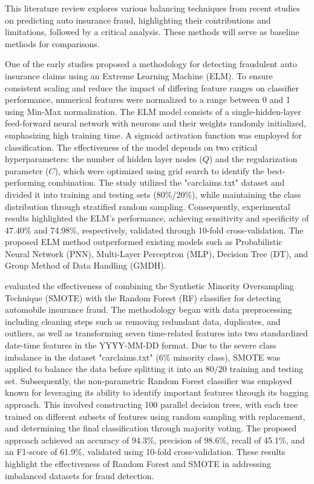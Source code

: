 \documentclass[twoside,11pt]{article}
\begin{document}
This literature review explores various balancing techniques from recent studies on predicting auto insurance fraud, highlighting their contributions and limitations, followed by a critical analysis. These methods will serve as baseline methods for comparisons.

One of the early studies \cite{Patel2019} proposed a methodology for detecting fraudulent auto insurance claims using an Extreme Learning Machine (ELM). To ensure consistent scaling and reduce the impact of differing feature ranges on classifier performance, numerical features were normalized to a range between 0 and 1 using Min-Max normalization. The ELM model consists of a single-hidden-layer feed-forward neural network with neurons and their weights randomly initialized, emphasizing high training time. A sigmoid activation function was employed for classification. The effectiveness of the model depends on two critical hyperparameters: the number of hidden layer nodes (\(Q\)) and the regularization parameter (\(C\)), which were optimized using grid search to identify the best-performing combination. The study utilized the "carclaims.txt" dataset and divided it into training and testing sets (80\%/20\%), while maintaining the class distribution through stratified random sampling. Consequently, experimental results highlighted the ELM's performance, achieving sensitivity and specificity of 47.40\% and 74.98\%, respectively, validated through 10-fold cross-validation. The proposed ELM method outperformed existing models such as Probabilistic Neural Network (PNN), Multi-Layer Perceptron (MLP), Decision Tree (DT), and Group Method of Data Handling (GMDH).


\cite{Harjai2019} evaluated the effectiveness of combining the Synthetic Minority Oversampling Technique (SMOTE) with the Random Forest (RF) classifier for detecting automobile insurance fraud. The methodology began with data preprocessing including cleaning steps such as removing redundant data, duplicates, and outliers, as well as transforming seven time-related features into two standardized date-time features in the YYYY-MM-DD format. Due to the severe class imbalance in the dataset "carclaims.txt" (6\% minority class), SMOTE was applied to balance the data before splitting it into an 80/20 training and testing set. Subsequently, the non-parametric Random Forest classifier was employed known for leveraging its ability to identify important features through its bagging approach. This involved constructing 100 parallel decision trees, with each tree trained on different subsets of features using random sampling with replacement, and determining the final classification through majority voting. The proposed approach achieved an accuracy of 94.3\%, precision of 98.6\%, recall of 45.1\%, and an F1-score of 61.9\%, validated using 10-fold cross-validation. These results highlight the effectiveness of Random Forest and SMOTE in addressing imbalanced datasets for fraud detection.
\end{document}
